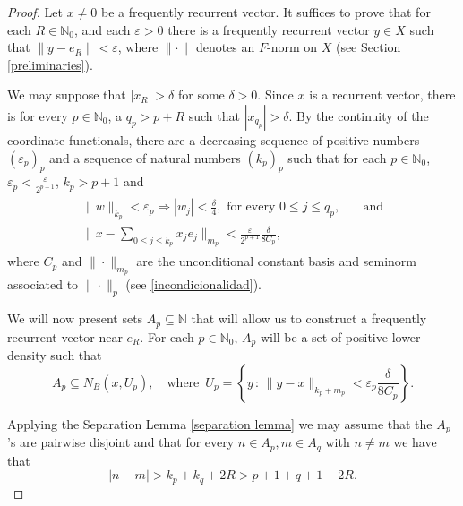 \documentclass[10pt,a4paper]{amsart}
\newcommand{\sub}{\subseteq}
\newcommand{\zN}{\mathbb N}
\begin{document}
\begin{proof}
Let $x\neq 0$ be a frequently recurrent vector. It suffices to prove that for each $R\in\mathbb N_0$, and each $\varepsilon>0$ there is a frequently recurrent vector $y\in X$ such that $\|y-e_R\|<\varepsilon$, where $\|\cdot\|$ denotes an $F$-norm on $X$ (see Section \ref{preliminaries}). 

We may suppose that   $|x_R|>\delta$ for some $\delta>0$.   
Since $x$ is a recurrent vector,  there is for every $p\in\mathbb N_0$, a  $q_p>p+R$ such that $|x_{q_p}|>\delta$. By the continuity of the coordinate functionals,  there are a decreasing sequence of positive numbers $(\varepsilon_p)_p$ and a sequence of natural numbers $(k_p)_p$ such that for each $p\in\mathbb N_0$, $\varepsilon_{p}<\frac{\varepsilon}{2^{p+1}}$, $k_p>p+1$ and   
\begin{align}\label{eq: beta_p (zero one freq) UNIL}
 \begin{split}
  \|w\|_{k_p}<\varepsilon_{p}\Longrightarrow  |w_{j}|<\frac{\delta}{4} ,  \text{ for every } 0\leq j\leq q_p, &\quad \text{and}\\
 \|x-\sum_{0\leq j\le k_p} x_j e_j\|_{m_p}<\frac{\varepsilon}{2^{p+1}}\frac{\delta}{8C_p},&
 \end{split}
 \end{align}
 where $C_p$ and $\|\cdot\|_{m_p}$ are the unconditional constant basis and seminorm associated to $\|\cdot\|_p$ (see \eqref{incondicionalidad}). 



We will now present sets $A_p\sub \zN$  that will allow us to construct a frequently recurrent vector near $e_R$. For each $p\in\mathbb N_0$, $A_p$ will be a set of positive lower  density such that  
\begin{equation}\label{eq: A_p zero one freq}
A_p\sub N_B(x,U_p),\quad\text{where }\, U_p=\left\{y\,:\, \|y-x\|_{k_p+m_p}<\varepsilon_p\frac{\delta}{8C_p}\right\}.
\end{equation}

Applying the Separation Lemma \ref{separation lemma}
we may assume that the $A_p$'s are pairwise disjoint and that for every $n\in A_p,m\in A_q$ with $n\neq m$ we have that
\begin{equation}\label{eq separation zero one freq}
|n-m|>k_p+k_q+2R>p+1+q+1+2R.    
\end{equation}


\end{proof}
\end{document}
